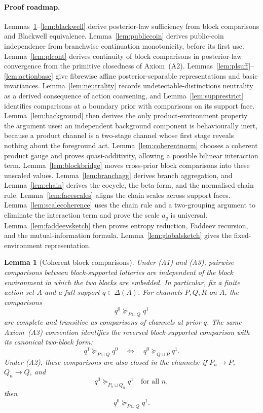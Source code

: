 \documentclass[11pt,a4paper]{article}
\newtheorem{lemma}[theorem]{Lemma}
\theoremstyle{definition}
\newcommand{\1}{\mathbf 1}
\begin{document}
\paragraph{Proof roadmap.}
Lemmas~\ref{lem:blockcoh}--\ref{lem:blackwell} derive posterior-law sufficiency from block comparisons and Blackwell
equivalence.  Lemma~\ref{lem:publiccoin} derives public-coin independence from branchwise continuation monotonicity,
before its first use.  Lemma~\ref{lem:plcont} derives continuity of block comparisons in posterior-law convergence from the
primitive closedness of Axiom~\textup{(A2)}.
Lemmas~\ref{lem:plsuff}--\ref{lem:actionbase} give fibrewise affine posterior-separable representations
and basic invariances.  Lemma~\ref{lem:neutrality} records undetectable-distinctions neutrality as a derived consequence
of action coarsening, and Lemma~\ref{lem:supprestrict} identifies comparisons at a boundary prior with comparisons on its
support face.  Lemma~\ref{lem:background} then derives the only product-environment property the argument uses: an
independent background component is behaviourally inert, because a product channel is a two-stage channel whose first
stage reveals nothing about the foreground act.  Lemma~\ref{lem:coherentnorm} chooses a coherent product gauge and proves
quasi-additivity, allowing a possible bilinear interaction term.  Lemma~\ref{lem:blockbridge} moves cross-prior block
comparisons into these unscaled values.  Lemma~\ref{lem:branchagg} derives branch aggregation, and Lemma~\ref{lem:chain} derives the cocycle,
the beta-form, and the normalised chain rule.  Lemma~\ref{lem:facescales} aligns the chain scales across support faces.
Lemma~\ref{lem:scalecoherence} uses the chain rule and a two-grouping argument to eliminate the interaction term and prove
the scale $a_q$ is universal.
Lemma~\ref{lem:faddeevsketch} then proves entropy reduction, Faddeev recursion, and the mutual-information formula.
Lemma~\ref{lem:globalsketch} gives the fixed-environment representation.

\begin{lemma}[Coherent block comparisons]\label{lem:blockcoh}
Under \textup{(A1)} and \textup{(A3)}, pairwise comparisons between block-supported lotteries are independent of the block
environment in which the two blocks are embedded.  In particular, fix a finite action set $A$ and a full-support
$q\in\Delta(A)$.  For channels $P,Q,R$ on $A$, the comparisons
\[
q^0\succeq_{P\sqcup Q}q^1
\]
are complete and transitive as comparisons of channels at prior $q$.  The same Axiom~\textup{(A3)} convention identifies
the reversed block-supported comparison with its canonical two-block form:
\[
q^1\succeq_{P\sqcup Q}q^0
\quad\Longleftrightarrow\quad
q^0\succeq_{Q\sqcup P}q^1.
\]
Under \textup{(A2)}, these comparisons are also closed in the channels: if
$P_n\to P$, $Q_n\to Q$, and
\[
q^0\succeq_{P_n\sqcup Q_n}q^1
\quad\text{for all }n,
\]
then
\[
q^0\succeq_{P\sqcup Q}q^1.
\]
\end{lemma}
\end{document}
